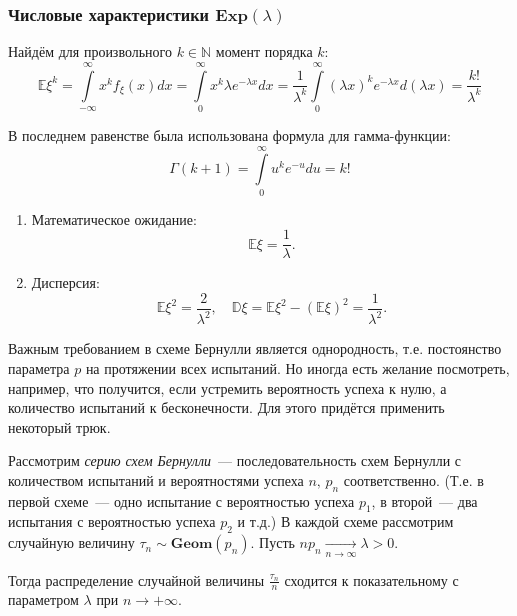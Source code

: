 \subsubsection{Числовые характеристики $\mathbf{Exp}(\lambda)$}

Найдём для произвольного $k \in \mathbb{N}$ момент порядка $k$:
\begin{equation*}
    \mathbb{E} \xi^{k}=\int\limits_{-\infty}^{\infty} x^{k} f_{\xi}(x) d x=\int\limits_{0}^{\infty} x^{k} \lambda e^{-\lambda x} d x=\frac{1}{\lambda^{k}} \int\limits_{0}^{\infty}(\lambda x)^{k} e^{-\lambda x} d(\lambda x)=\frac{k !}{\lambda^{k}}
\end{equation*}

В последнем равенстве была использована формула для гамма-функции:
\begin{equation*}
    \Gamma(k+1)=\int\limits_{0}^{\infty} u^{k} e^{-u} d u=k !
\end{equation*}
\begin{enumerate}
    \item Математическое ожидание:
    \begin{equation*}
        \mathbb{E} \xi=\frac{1}{\lambda}.
    \end{equation*}
    \item Дисперсия:
    \begin{equation*}
        \mathbb{E} \xi^{2}=\frac{2}{\lambda^{2}}, \quad \mathbb{D} \xi=\mathbb{E} \xi^{2}-(\mathbb{E} \xi)^{2}=\frac{1}{\lambda^{2}}.
    \end{equation*}
\end{enumerate}

\vspace{1cm}

Важным требованием в схеме Бернулли является однородность, т.е. постоянство параметра $p$ на протяжении всех испытаний.
Но иногда есть желание посмотреть, например, что получится, если устремить вероятность успеха к нулю, а количество испытаний к бесконечности.
Для этого придётся применить некоторый трюк.
\begin{thm*}
    Рассмотрим \textit{серию схем Бернулли}~--- последовательность схем Бернулли с количеством испытаний и вероятностями успеха $n, \, p_n$ соответственно.
    (Т.е. в первой схеме~--- одно испытание с вероятностью успеха $p_1$, в второй~--- два испытания с вероятностью успеха $p_2$ и т.д.)
    В каждой схеме рассмотрим случайную величину $\tau_n \sim \mathbf{Geom}(p_n)$.
    Пусть $n p_n \xrightarrow[n \to \infty]{} \lambda > 0$.

    Тогда распределение случайной величины $\frac{\tau_n}{n}$ сходится к показательному с параметром $\lambda$ при $n \to +\infty$.
\end{thm*}

